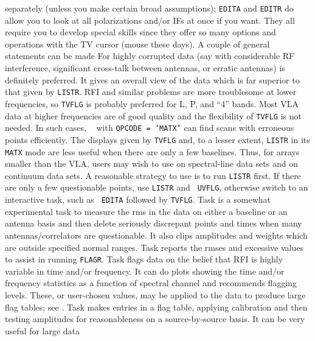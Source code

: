 separately (unless you make certain broad assumptions); {\tt EDITA}
and {\tt EDITR} do allow you to look at all polarizations and/or IFs
at once if you want.  They all require you to develop special skills
since they offer so many options and operations with the TV cursor
(mouse these days).  A couple of general statements can be
made
\xbit
\Item For highly corrupted data (say with considerable RF
    interference, significant cross-talk between antennas, or erratic
    antennas) {\tt {}} is definitely preferred.  It gives an
    overall view of the data which is far superior to that given by
    \hbox{{\tt LISTR}}.  RFI and similar problems are more troublesome
    at lower frequencies, so {\tt TVFLG} is probably preferred for L,
    P, and ``4'' bands.
\Item Most VLA data at higher frequencies are of good quality and
    the flexibility of {\tt TVFLG} is not needed.  In such cases, {\tt
    } with {\tt OPCODE = 'MATX'} can find scans with
    erroneous points efficiently.
\Item The displays given by {\tt TVFLG} and, to a lesser extent,
    {\tt LISTR} in its {\tt MATX} mode are less useful when there are
    only a few baselines.  Thus, for arrays smaller than the VLA,
    users may wish to use {\tt {}} on spectral-line data
    sets and {\tt {}} on continuum data sets.
\Item A reasonable strategy to use is to run {\tt LISTR} first.  If
    there are only a few questionable points, use {\tt LISTR} and {\tt
    UVFLG}, otherwise switch to an interactive task, such as {\tt
    EDITA} followed by \hbox{{\tt TVFLG}}.
\Item Task {\tt {}} is a somewhat experimental task to
    measure the rms in the data on either a baseline or an antenna
    basis and then delete seriously discrepant points and times when
    many antennas/correlators are questionable.  It also clips
    amplitudes and weights which are outside specified normal ranges.
    Task {\tt {}} reports the rmses and excessive values to
    assist in running {\tt FLAGR}\@.
\Item Task {\tt {}} flags data on the belief that RFI is
    highly variable in time and/or frequency.  It can do plots showing
    the time and/or frequency statistics as a function of spectral
    channel and recommends flagging levels.  These, or user-chosen
    values, may be applied to the data to produce large flag tables;
    see .
\Item Task {\tt {}} makes entries in a flag table, applying
    calibration and then testing amplitudes for reasonableness on a
    source-by-source basis.  It can be very useful for large data
